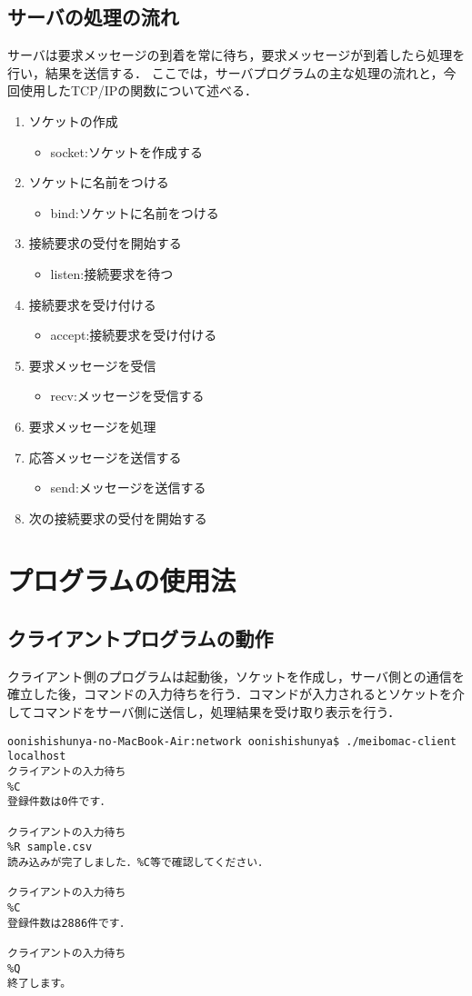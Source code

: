 \documentclass[a4j]{jarticle}
\begin{document}
\subsection{サーバの処理の流れ}
サーバは要求メッセージの到着を常に待ち，要求メッセージが到着したら処理を行い，結果を送信する．
ここでは，サーバプログラムの主な処理の流れと，今回使用したTCP/IPの関数について述べる．
\begin{enumerate}
\item ソケットの作成
	\begin{itemize}
	\item socket:ソケットを作成する
	\end{itemize}
\item ソケットに名前をつける
	\begin{itemize}
	\item bind:ソケットに名前をつける
	\end{itemize}
\item 接続要求の受付を開始する
	\begin{itemize}
	\item listen:接続要求を待つ
	\end{itemize}
\item 接続要求を受け付ける
	\begin{itemize}
	\item accept:接続要求を受け付ける
	\end{itemize}
\item 要求メッセージを受信
	\begin{itemize}
	\item recv:メッセージを受信する
	\end{itemize}
\item 要求メッセージを処理
\item 応答メッセージを送信する
	\begin{itemize}
	\item send:メッセージを送信する
	\end{itemize}
\item 次の接続要求の受付を開始する
\end{enumerate}

\section{プログラムの使用法}
\subsection{クライアントプログラムの動作}
クライアント側のプログラムは起動後，ソケットを作成し，サーバ側との通信を確立した後，コマンドの入力待ちを行う．コマンドが入力されるとソケットを介してコマンドをサーバ側に送信し，処理結果を受け取り表示を行う．
\begin{verbatim}
oonishishunya-no-MacBook-Air:network oonishishunya$ ./meibomac-client localhost
クライアントの入力待ち
%C
登録件数は0件です．

クライアントの入力待ち
%R sample.csv
読み込みが完了しました．%C等で確認してください．

クライアントの入力待ち
%C
登録件数は2886件です．

クライアントの入力待ち
%Q
終了します。
\end{verbatim}
\end{document}
